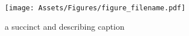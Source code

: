 \begin{figure}[h]
	\centering
	\texttt{[image: Assets/Figures/figure\_filename.pdf]}
	\caption{a succinct and describing caption}
	\label{fig:reference_label}
\end{figure}